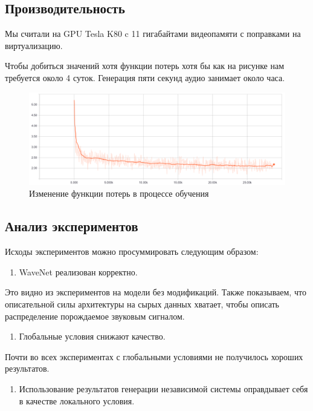 \documentclass[../diploma.tex]{subfiles}
\begin{document}
\subsection{Производительность}

Мы считали на GPU Tesla K80 c 11 гигабайтами видеопамяти с поправками на виртуализацию.

Чтобы добиться значений хотя функции потерь хотя бы как на рисунке \label{fig:perf} нам требуется около 4 суток. Генерация пяти секунд аудио занимает около часа.

\begin{figure}[h!]
  \includegraphics[scale=0.36]{img/perf}
  \caption{Изменение функции потерь в процессе обучения}
  \label{fig:perf}
\end{figure}

\subsection{Анализ экспериментов}

Исходы экспериментов можно просуммировать следующим образом:

\begin{enumerate}[resume]
    \item WaveNet реализован корректно.
\end{enumerate}

Это видно из экспериментов на модели без модификаций. Также показываем, что описательной силы архитектуры на сырых данных хватает, чтобы описать распределение порождаемое звуковым сигналом.

\begin{enumerate}[resume]
    \item Глобальные условия снижают качество.
\end{enumerate}

Почти во всех экспериментах с глобальными условиями не получилось хороших результатов.

\begin{enumerate}[resume]
    \item Использование результатов генерации независимой системы оправдывает себя  в качестве локального условия.
\end{enumerate}
\end{document}
